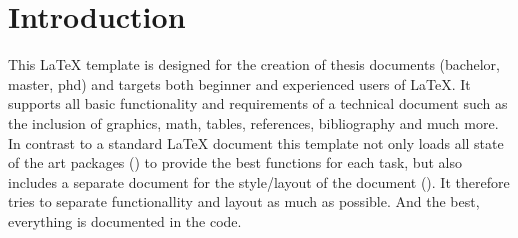 \chapter{Introduction}
\label{ch:intro}

This \LaTeX{} template is designed for the creation of thesis documents (bachelor, master, phd) and targets both beginner and experienced users of \LaTeX{}. It supports all basic functionality and requirements of a technical document such as the inclusion of graphics, math, tables, references, bibliography and much more. In contrast to a standard LaTeX document this template not only loads all state of the art packages () to provide the best functions for each task, but also includes a separate document for the style/layout of the document (). It therefore tries to separate functionallity and layout as much as possible. And the best, everything is documented in the code.
